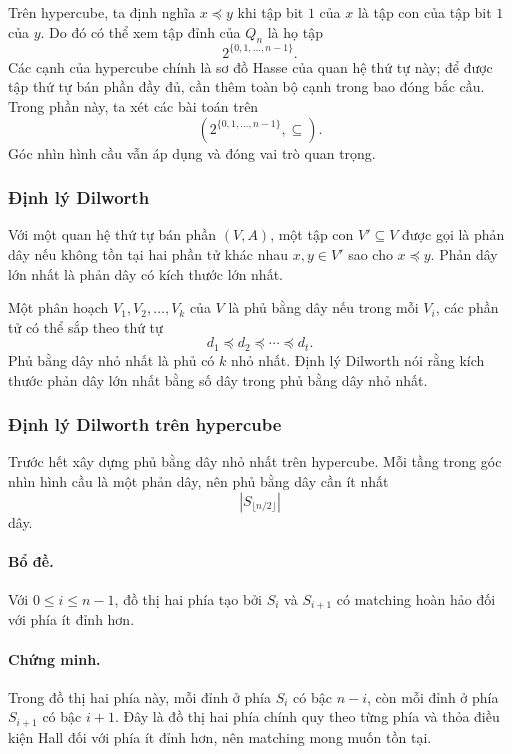 \documentclass[11pt]{article}
\begin{document}
Trên hypercube, ta định nghĩa \(x\preceq y\) khi tập bit \(1\) của \(x\) là
tập con của tập bit \(1\) của \(y\). Do đó có thể xem tập đỉnh của \(Q_n\) là
họ tập
\[
  2^{\{0,1,\ldots,n-1\}}.
\]
Các cạnh của hypercube chính là sơ đồ Hasse của quan hệ thứ tự này; để được
tập thứ tự bán phần đầy đủ, cần thêm toàn bộ cạnh trong bao đóng bắc cầu. Trong
phần này, ta xét các bài toán trên
\[
  (2^{\{0,1,\ldots,n-1\}},\subseteq).
\]
Góc nhìn hình cầu vẫn áp dụng và đóng vai trò quan trọng.

\subsubsection{Định lý Dilworth}

Với một quan hệ thứ tự bán phần \((V,A)\), một tập con \(V'\subseteq V\) được
gọi là phản dây nếu không tồn tại hai phần tử khác nhau \(x,y\in V'\) sao cho
\(x\preceq y\). Phản dây lớn nhất là phản dây có kích thước lớn nhất.

Một phân hoạch \(V_1,V_2,\ldots,V_k\) của \(V\) là phủ bằng dây nếu trong mỗi
\(V_i\), các phần tử có thể sắp theo thứ tự
\[
  d_1\preceq d_2\preceq\cdots\preceq d_t.
\]
Phủ bằng dây nhỏ nhất là phủ có \(k\) nhỏ nhất. Định lý Dilworth nói rằng kích
thước phản dây lớn nhất bằng số dây trong phủ bằng dây nhỏ nhất.

\subsubsection{Định lý Dilworth trên hypercube}

Trước hết xây dựng phủ bằng dây nhỏ nhất trên hypercube. Mỗi tầng trong góc
nhìn hình cầu là một phản dây, nên phủ bằng dây cần ít nhất
\[
  |S_{\lfloor n/2\rfloor}|
\]
dây.

\paragraph{Bổ đề.}
Với \(0\le i\le n-1\), đồ thị hai phía tạo bởi \(S_i\) và \(S_{i+1}\) có
matching hoàn hảo đối với phía ít đỉnh hơn.

\paragraph{Chứng minh.}
Trong đồ thị hai phía này, mỗi đỉnh ở phía \(S_i\) có bậc \(n-i\), còn mỗi
đỉnh ở phía \(S_{i+1}\) có bậc \(i+1\). Đây là đồ thị hai phía chính quy theo
từng phía và thỏa điều kiện Hall đối với phía ít đỉnh hơn, nên matching mong
muốn tồn tại.
\end{document}
